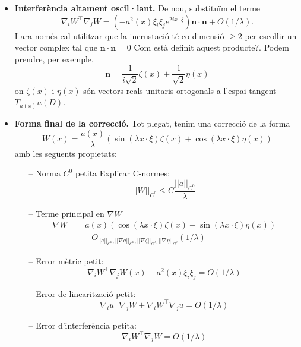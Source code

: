 \documentclass[11pt,a4paper,openright,oneside]{book}
\numberwithin{equation}{section}
\theoremstyle{definition}
\begin{document}
\begin{itemize}
    \item \textbf{Interferència altament oscil·lant.} De nou, substituïm el terme
    \begin{equation*}
        \nabla_iW^{\intercal}\nabla_jW = (-a^2(x)\xi_i\xi_je^{2ix\cdot\xi})\textbf{n}\cdot\textbf{n} + O(1/\lambda).
    \end{equation*}
    I ara només cal utilitzar que la incrustació té co-dimensió $\ge2$ per escollir un vector complex tal que $\textbf{n}\cdot\textbf{n} = 0$ {\color{blue}Com està definit aquest producte?}. Podem prendre, per exemple, 
    \begin{equation*}
        \textbf{n} = \frac{1}{i\sqrt2}\zeta(x) + \frac{1}{\sqrt2}\eta(x)
    \end{equation*}
    on $\zeta(x)$ i $\eta(x)$ són vectors reals unitaris ortogonals a l'espai tangent $T_{u(x)}u(D)$.
    \item \textbf{Forma final de la correcció.} Tot plegat, tenim una correcció de la forma
    \begin{equation*}
        W(x) = \frac{a(x)}{\lambda}\left( \sin(\lambda x \cdot \xi)\zeta(x) + \cos(\lambda x \cdot \xi)\eta(x) \right)
    \end{equation*}
    amb les següents propietats:
    \begin{itemize}
        \item[--] Norma $C^0$ petita {\color{blue} Explicar C-normes}: $$||W||_{C^0}\le C\frac{||a||_{C^0}}{\lambda}$$
        \item[--] Terme principal en $\nabla W$ 
        \begin{equation*}
            \begin{aligned}
                \nabla W = &a(x)\left( \cos(\lambda x \cdot \xi)\zeta(x) - \sin(\lambda x \cdot \xi)\eta(x) \right) \\
                &+ O_{||a||_{C^0}, ||\nabla a||_{C^0}, ||\nabla\zeta||_{C^0}, ||\nabla\eta||_{C^0}}(1/\lambda)
            \end{aligned}
        \end{equation*}
        \item[--] Error mètric petit: $$\nabla_i W^{\intercal}\nabla_j W(x) -a^2(x)\xi_i\xi_j = O(1/\lambda)$$
        \item[--] Error de linearització petit: $$\nabla_i u ^{\intercal}\nabla_j W + \nabla_iW^{\intercal}\nabla_ju = O(1/\lambda)$$
        \item[--] Error d'interferència petita: $$\nabla_i W ^{\intercal}\nabla_j W = O(1/\lambda)$$
    \end{itemize}
\end{itemize}
\end{document}
